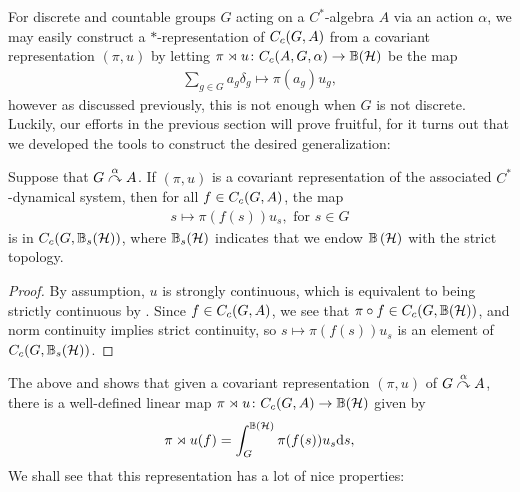 For discrete and countable groups $G$ acting on a $C^*$-algebra $A$ via an action $\alpha$, we may easily construct a $*$-representation of $C_c(G,A)$ from a covariant representation $(\pi,u)$ by letting $\pi \rtimes u \colon C_c(A,G,\alpha) \to \mathbb{B}(\mathcal{H})$ be the map
\begin{align*}
\sum_{g \in G} a_g \delta_g \mapsto \pi(a_g) u_g,
\end{align*}
however as discussed previously, this is not enough when $G$ is not discrete. Luckily, our efforts in the previous section will prove fruitful, for it turns out that we developed the tools to construct the desired generalization:
\begin{lemma}
Suppose that $G \stackrel{\alpha}{\curvearrowright} A$. If $(\pi,u)$ is a covariant representation of the associated $C^*$-dynamical system, then for all $f \in C_c(G,A)$, the map
\begin{align*}
	s \mapsto \pi(f(s)) u_s, \text{ for }s \in G
\end{align*}
is in $C_c(G,\mathbb{B}_s(\mathcal{H}))$, where $\mathbb{B}_s(\mathcal{H})$ indicates that we endow $\mathbb{B}\left(\mathcal{H} \right)$ with the strict topology.
\label{cross:integrandcont}
\end{lemma}
\begin{proof}
By assumption, $u$ is strongly continuous, which is equivalent to being strictly continuous by . Since $f \in C_c(G,A)$, we see that $\pi \circ f \in C_c(G,\mathbb{B}(\mathcal{H}))$, and norm continuity implies strict continuity, so $s \mapsto \pi(f(s)) u_s$ is an element of $C_c(G,\mathbb{B}_s(\mathcal{H}))$.
\end{proof}
The above and  shows that given a covariant representation $(\pi,u)$ of $G \stackrel{\alpha}{\curvearrowright} A$, there is a well-defined linear map $\pi \rtimes u \colon C_c(G,A) \to \mathbb{B}(\mathcal{H})$ given by
\begin{align*}
\pi \rtimes u (f) = \int_G^{\mathbb{B}(\mathcal{H})} \pi(f(s)) u_s \mathrm{d} s,
\end{align*}
We shall see that this representation has a lot of nice properties:

